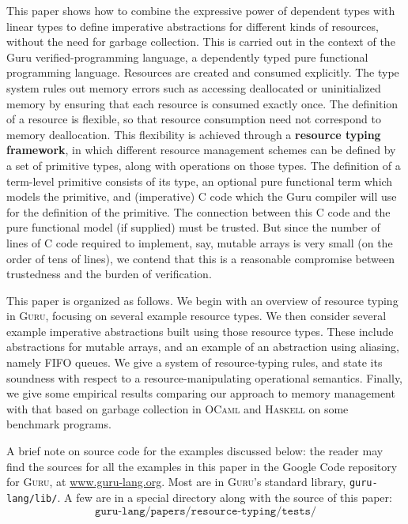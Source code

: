 \documentclass[9pt,natbib]{sigplanconf}
\begin{document}
This paper shows how to combine the expressive power of dependent
types with linear types to define imperative abstractions for
different kinds of resources, without the need for garbage collection.
This is carried out in the context of the Guru verified-programming
language, a dependently typed pure functional programming language.
Resources are created and consumed explicitly.  The type system rules
out memory errors such as accessing deallocated or uninitialized
memory by ensuring that each resource is consumed exactly once.  The
definition of a resource is flexible, so that resource consumption
need not correspond to memory deallocation.  This flexibility is
achieved through a \textbf{resource typing framework}, in which
different resource management schemes can be defined by a set of
primitive types, along with operations on those types.  The definition
of a term-level primitive consists of its type, an optional pure
functional term which models the primitive, and (imperative) C code
which the Guru compiler will use for the definition of the primitive.
The connection between this C code and the pure functional model (if
supplied) must be trusted.  But since the number of lines of C code
required to implement, say, mutable arrays is very small (on the order
of tens of lines), we contend that this is a reasonable compromise
between trustedness and the burden of verification.

This paper is organized as follows.  We begin with an overview of
resource typing in \textsc{Guru}, focusing on several example resource
types.  We then consider several example imperative abstractions built
using those resource types.  These include abstractions for mutable
arrays, and an example of an abstraction using aliasing, namely FIFO
queues.  We give a system of resource-typing rules, and state its
soundness with respect to a resource-manipulating operational
semantics.  Finally, we give some empirical results comparing our
approach to memory management with that based on garbage collection in
\textsc{OCaml} and \textsc{Haskell} on some benchmark programs.

A brief note on source code for the examples discussed below: the
reader may find the sources for all the examples in this paper in the
Google Code repository for \textsc{Guru}, at \url{www.guru-lang.org}.
Most are in \textsc{Guru}'s standard library, \texttt{guru-lang/lib/}.  A few
are in a special directory along with the source of this paper:
\[
\texttt{guru-lang/papers/resource-typing/tests/}
\]
\end{document}

